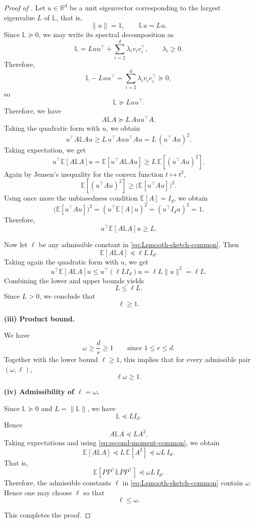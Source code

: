 \documentclass[10pt]{article}
\newcommand{\E}{\mathbb{E}}
\newcommand{\R}{\mathbb{R}}
\newcommand{\Lmat}{\mathbb{L}}
\begin{document}
\begin{proof}[Proof of ]
Let \(u\in\R^d\) be a unit eigenvector corresponding to the largest
eigenvalue \(L\) of \(\Lmat\), that is,
\[
\|u\|=1,
\qquad
\Lmat u=Lu.
\]
Since \(\Lmat\succeq 0\), we may write its spectral decomposition as
\[
\Lmat
=
Luu^\top + \sum_{i=2}^d \lambda_i v_iv_i^\top,
\qquad
\lambda_i\ge 0.
\]
Therefore,
\[
\Lmat - Luu^\top
=
\sum_{i=2}^d \lambda_i v_iv_i^\top
\succeq 0,
\]
so
\[
\Lmat \succeq Luu^\top.
\]
Therefore, we have
\[
A\Lmat A \succeq L\,Auu^\top A.
\]
Taking the quadratic form with \(u\), we obtain
\[
u^\top A\Lmat A u
\ge
L\,u^\top Auu^\top A u
=
L\,(u^\top Au)^2.
\]
Taking expectation, we get
\[
u^\top \E[A\Lmat A]u
=
\E[u^\top A\Lmat A u]
\ge
L\,\E[(u^\top Au)^2].
\]
Again by Jensen's inequality for the convex function \(t\mapsto t^2\),
\[
\E[(u^\top Au)^2]
\ge
\bigl(\E[u^\top Au]\bigr)^2.
\]
Using once more the unbiasedness condition \(\E[A]=I_d\), we obtain
\[
\bigl(\E[u^\top Au]\bigr)^2
=
(u^\top \E[A]u)^2
=
(u^\top I_du)^2
=
1.
\]
Therefore,
\[
u^\top \E[A\Lmat A]u \ge L.
\]

Now let \(\ell\) be any admissible constant in \eqref{eq:Lsmooth-sketch-common}. Then
\[
\E[A\Lmat A]\preceq \ell L\,I_d.
\]
Taking again the quadratic form with \(u\), we get
\[
u^\top \E[A\Lmat A]u
\le
u^\top (\ell L I_d)u
=
\ell L\|u\|^2
=
\ell L.
\]
Combining the lower and upper bounds yields
\[
L\le \ell L.
\]
Since \(L>0\), we conclude that
\[
\ell\ge 1.
\]

\par\smallskip
\noindent\textbf{(iii) Product bound.}

We have 
\[
\omega\ge \frac{d}{r}\ge 1
\qquad
\text{since }1\le r\le d.
\]
Together with the lower bound \(\ell\ge1\), this implies that for every admissible pair \((\omega,\ell)\),
\[
\ell\omega\ge 1.
\]


\par\smallskip
\noindent\textbf{(iv) Admissibility of \(\ell=\omega\).}

Since \(\Lmat\succeq 0\) and \(L=\|\Lmat\|\), we have
\[
\Lmat\preceq LI_d.
\]
Hence
\[
A\Lmat A \preceq LA^2.
\]
Taking expectations and using \eqref{eq:second-moment-common}, we obtain
\[
\E[A\Lmat A]
\preceq
L\,\E[A^2]
\preceq
\omega L\,I_d.
\]
That is,
\[
\E[PP^\top \Lmat PP^\top]\preceq \omega L\,I_d.
\]
Therefore, the admissible constants \(\ell\) in \eqref{eq:Lsmooth-sketch-common}
contain \(\omega\). Hence one may choose \(\ell\) so that
\[
\ell\le \omega.
\]

This completes the proof.
\end{proof}
\end{document}
